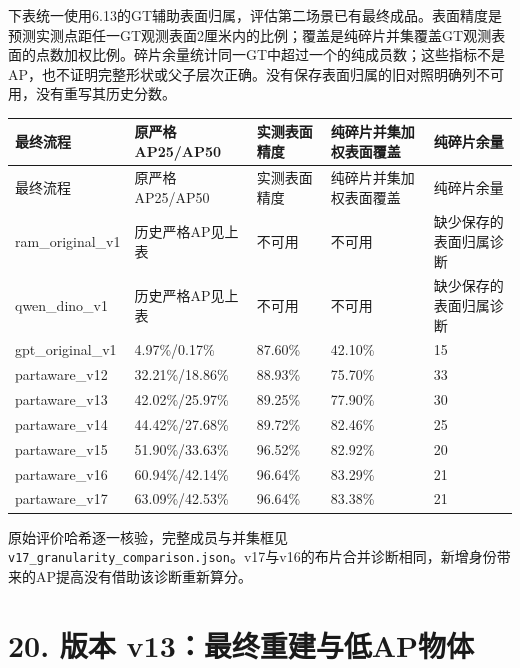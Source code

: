 \documentclass[UTF8,fontset=fandol]{ctexart}
\begin{document}
下表统一使用6.13的GT辅助表面归属，评估第二场景已有最终成品。表面精度是预测实测点距任一GT观测表面2厘米内的比例；覆盖是纯碎片并集覆盖GT观测表面的点数加权比例。碎片余量统计同一GT中超过一个的纯成员数；这些指标不是AP，也不证明完整形状或父子层次正确。没有保存表面归属的旧对照明确列不可用，没有重写其历史分数。



{\small
\begin{longtable}{|p{}|p{}|p{}|p{}|p{}|}
\hline
最终流程 & 原严格AP25/AP50 & 实测表面精度 & 纯碎片并集加权表面覆盖 & 纯碎片余量 \\ \hline
\endfirsthead
\hline
最终流程 & 原严格AP25/AP50 & 实测表面精度 & 纯碎片并集加权表面覆盖 & 纯碎片余量 \\ \hline
\endhead
ram\_original\_v1 & 历史严格AP见上表 & 不可用 & 不可用 & 缺少保存的表面归属诊断 \\ \hline
qwen\_dino\_v1 & 历史严格AP见上表 & 不可用 & 不可用 & 缺少保存的表面归属诊断 \\ \hline
gpt\_original\_v1 & 4.97\%/0.17\% & 87.60\% & 42.10\% & 15 \\ \hline
partaware\_v12 & 32.21\%/18.86\% & 88.93\% & 75.70\% & 33 \\ \hline
partaware\_v13 & 42.02\%/25.97\% & 89.25\% & 77.90\% & 30 \\ \hline
partaware\_v14 & 44.42\%/27.68\% & 89.72\% & 82.46\% & 25 \\ \hline
partaware\_v15 & 51.90\%/33.63\% & 96.52\% & 82.92\% & 20 \\ \hline
partaware\_v16 & 60.94\%/42.14\% & 96.64\% & 83.29\% & 21 \\ \hline
partaware\_v17 & 63.09\%/42.53\% & 96.64\% & 83.38\% & 21 \\ \hline
\end{longtable}
}

原始评价哈希逐一核验，完整成员与并集框见\texttt{v17\_\allowbreak{}granularity\_\allowbreak{}comparison.\allowbreak{}json}。v17与v16的布片合并诊断相同，新增身份带来的AP提高没有借助该诊断重新算分。



\section*{20. 版本 v13：最终重建与低AP物体}
\end{document}
